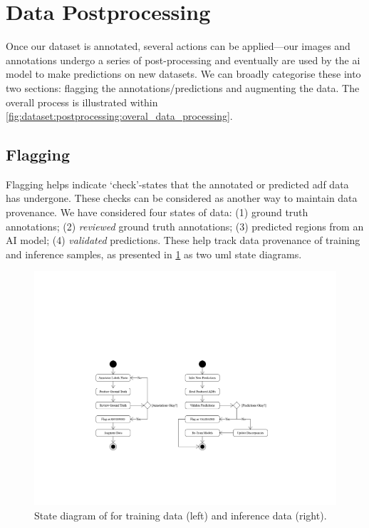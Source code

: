 \section{Data Postprocessing}
\label{sec:dataset:postprocessing}

Once our dataset is annotated, several actions can be applied---our images and annotations undergo a series of post-processing and eventually are used by the \gls{ai} model to make predictions on new datasets. We can broadly categorise these into two sections: flagging the annotations/predictions and augmenting the data. The overall process is illustrated within \cref{fig:dataset:postprocessing:overal_data_processing}.

\subsection{Flagging}
\label{sec:dataset:postprocessing:flagging}

Flagging helps indicate `check'-states that the annotated or predicted \gls{adf} data has undergone. These checks can be considered as another way to maintain data provenance. We have considered four states of data: (1) ground truth annotations; (2) \textit{reviewed} ground truth annotations; (3) predicted regions from an AI model; (4) \textit{validated} predictions. These help track data provenance of training and inference samples, as presented in \cref{fig:dataset:postprocessing:state_diagram_flagging} as two \gls{uml} state diagrams.

\begin{figure}[h]
  \centering
  \includegraphics[width=\textwidth]{images/dataset/flagging_statemodel}
  \caption[State diagram to represent flagging]{State diagram of for training data (left) and inference data (right).}
  \label{fig:dataset:postprocessing:state_diagram_flagging}
\end{figure}

